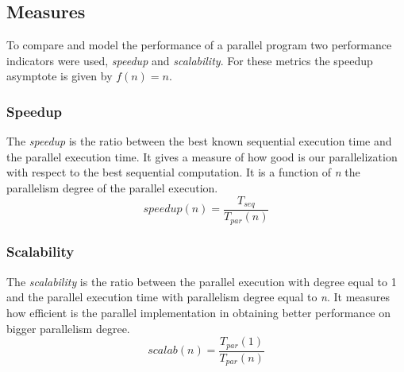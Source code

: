 \begin{figure}[H]
	\label{fig:fastflow_convergence}
	\endminipage
	\caption{}\label{algorithmsConvergence}
\end{figure}

\subsection{Measures}
To compare and model the performance of a parallel program two performance indicators were used, \textit{speedup} and \textit{scalability}. For these metrics the speedup asymptote is given by $f(n) = n$.
\subsubsection{Speedup}
The \textit{speedup} is the ratio between the best known sequential execution time and the parallel execution time. It gives a measure of how good is our parallelization with respect to the best sequential computation. It is a function of \textit{n} the parallelism degree of the parallel execution.
\begin{equation}
speedup(n) = \frac{T_{seq}}{T_{par}(n)}
\end{equation} 
\vspace{-2em}
\subsubsection{Scalability}
The \textit{scalability} is the ratio between the parallel execution with degree equal to 1 and the parallel execution time with parallelism degree equal to \textit{n}. It measures how efficient is the parallel implementation in obtaining better performance on bigger parallelism degree.
\begin{equation}
scalab(n) = \frac{T_{par}(1)}{T_{par}(n)}
\end{equation}

